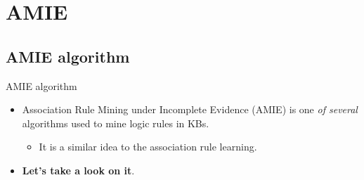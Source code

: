 \documentclass[xcolor={x11names}]{beamer}
\begin{document}



\section{AMIE}

\subsection{AMIE algorithm}
\begin{frame}{AMIE algorithm}
	\begin{itemize}
   		\item Association Rule Mining under Incomplete Evidence (AMIE) is one 
            \textit{of several} algorithms used to mine logic rules in KBs.
	    \begin{itemize}
            \item It is a similar idea to the association rule learning.
        \end{itemize}
        \item \textbf{Let’s take a look on it}.
	\end{itemize}
\end{frame}
\end{document}
